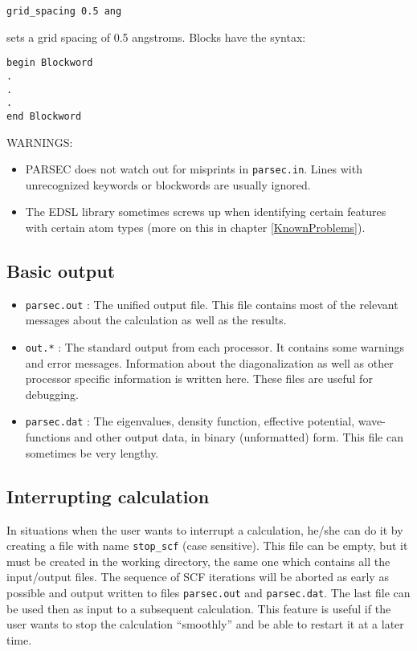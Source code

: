\documentclass{article}
\begin{document}
\begin{verbatim}
grid_spacing 0.5 ang
\end{verbatim}
%
sets a grid spacing of 0.5 angstroms. Blocks have the syntax:

\begin{verbatim}
begin Blockword
.
.
.
end Blockword
\end{verbatim}

WARNINGS: 

\begin{itemize}

\item PARSEC does not watch out for misprints in {\tt parsec.in}. Lines
with unrecognized keywords or blockwords are usually ignored.

\item The EDSL library sometimes screws up when identifying
certain features with certain atom types (more on this in
chapter \ref{KnownProblems}).
\end{itemize}



\subsection{Basic output}

\begin{itemize}
\item {\tt parsec.out} : The unified output file. This file contains
  most of the relevant messages about the calculation as well as the
  results.

\item {\tt out.*} : The standard output from each processor. It
  contains some warnings and error messages. Information about the
  diagonalization as well as other processor specific information is
  written here. These files are useful for debugging.

\item {\tt parsec.dat} : The eigenvalues, density function, effective
  potential, wave-functions and other output data, in binary
  (unformatted) form. This file can sometimes be very lengthy. 
\end{itemize}



\subsection{Interrupting calculation \label{StopSCF}}

In situations when the user wants to interrupt a calculation, he/she
can do it by creating a file with name {\tt stop\_scf} (case sensitive). This file can
be empty, but it must be created in the working directory, the same
one which contains all the input/output files. The sequence of
SCF iterations will be aborted as early as possible and output written
to files {\tt parsec.out} and {\tt parsec.dat}. The last file can be
used then as input to a subsequent calculation. This feature is useful
if the user wants to stop the calculation ``smoothly'' and be able to
restart it at a later time.
\end{document}
